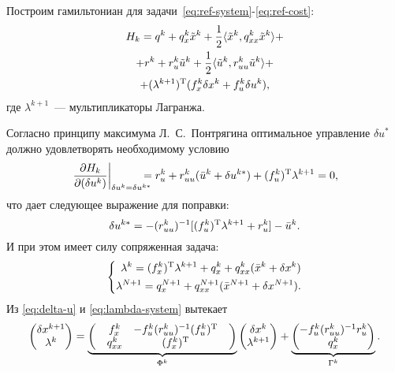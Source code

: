 \documentclass[../../doc.tex]{subfiles}
\begin{document}
    Построим гамильтониан для задачи~\eqref{eq:ref-system}-\eqref{eq:ref-cost}:
    \begin{multline}\label{eq:hamiltonian}
        H_k = q^{k} + q_x^{k}\tilde x^{k} + \frac{1}{2}\langle \tilde x^{k}, q_{xx}^{k}\tilde x^{k} \rangle
        +\\+
        r^{k} + r_u^{k}\tilde u^{k} + \frac{1}{2}\langle \tilde u^{k}, r_{uu}^{k}\tilde u^{k} \rangle
        +\\+
        (\lambda^{k+1})^\textnormal{T} (f_x^k \delta x^k + f_u^k \delta u^k),
    \end{multline}
    где $\lambda^{k+1}$~--- мультипликаторы Лагранжа.

    Согласно принципу максимума Л.~С.~Понтрягина \cite{pontryagin1983} оптимальное управление $\delta u^{*}$ должно удовлетворять необходимому условию
    \begin{equation*}
        \left.\frac{\partial H_k}{\partial (\delta u^k)}\right|_{\delta u^k = \delta u^{k*}}
        \!\!\!\!\!\!=
        r_u^k + r_{uu}^k(\bar u^k + \delta u^{k*}) + (f_u^k)^\textnormal{T}\lambda^{k+1} = 0,
    \end{equation*}
    что дает следующее выражение для поправки:
    \begin{equation}\label{eq:delta-u}
        \delta u^{k*} = - (r_{uu}^k)^{-1}[(f_u^k)^\textnormal{T}\lambda^{k+1} + r_u^k] - \bar u^k.
    \end{equation}
    И при этом имеет силу сопряженная задача:
    \begin{equation}\label{eq:lambda-system}
        \left\{\begin{aligned}
            \lambda^k = (f_x^k)^\textnormal{T} \lambda^{k+1} + q_x^k + q_{xx}^k(\bar x^k + \delta x^k)
            \\
            \lambda^{N+1} = q_x^{N+1} + q_{xx}^{N+1}(\bar x^{N+1} + \delta x^{N+1})
            .
        \end{aligned}\right.
    \end{equation}
    Из \eqref{eq:delta-u} и \eqref{eq:lambda-system} вытекает
    \begin{equation}\label{eq:delta-x-lambda-system}
        \begin{pmatrix}
            \delta x^{k+1}
            \\
            \lambda^{k}
        \end{pmatrix}
        =
        \underbrace{\begin{pmatrix}
            & f_x^k & -f^k_u (r^k_{uu})^{-1} (f^k_u)^\textnormal{T} &
            \\
            & q^k_{xx} & (f^k_x)^\textnormal{T} &
        \end{pmatrix}}_{\Phi^k}
        \begin{pmatrix}
            \delta x^k
            \\
            \lambda^{k+1}
        \end{pmatrix}
        +
        \underbrace{\begin{pmatrix}
            -f^k_u (r^k_{uu})^{-1} r^k_u
            \\
            q^k_x
        \end{pmatrix}}_{\Gamma^k}.
    \end{equation}
\end{document}
